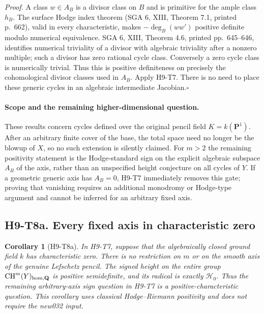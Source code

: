 \documentclass[11pt,a4paper]{article}
\newtheorem{corollary}[theorem]{Corollary}
\begin{document}
\emph{Proof.} A class $w\in A_B$ is a divisor class on $B$ and is
primitive for the ample class $h_B$. The surface Hodge index theorem
(SGA 6, XIII, Theorem 7.1, printed p.~662), valid in every
characteristic, makes $-\deg_B(ww')$ positive definite modulo numerical
equivalence. SGA 6, XIII, Theorem 4.6, printed pp.~645--646, identifies
numerical triviality of a divisor with algebraic triviality after a
nonzero multiple; such a divisor has zero rational cycle class.
Conversely a zero cycle class is numerically trivial. Thus this is
positive definiteness on precisely the cohomological divisor classes
used in $A_B$. Apply H9-T7. There is
no need to place these generic cycles in an algebraic intermediate
Jacobian.\hfill$\square$

\paragraph{Scope and the remaining higher-dimensional question.}
These results concern cycles defined over the original pencil field
$K=k(\mathbf P^1)$. After an arbitrary finite cover of the base, the
total space need no longer be the blowup of $X$, so no such extension is
silently claimed. For $m>2$ the remaining positivity statement is the
Hodge-standard sign on the explicit algebraic subspace $A_B$ of the
axis, rather than an unspecified height conjecture on all cycles of
$Y$. If a geometric generic axis has $A_B=0$, H9-T7 immediately removes
this gate; proving that vanishing requires an additional monodromy or
Hodge-type argument and cannot be inferred for an arbitrary fixed axis.


\subsection*{H9-T8a. Every fixed axis in characteristic zero}

\begin{corollary}[H9-T8a]\label{h9:T8a}
In H9-T7, suppose that the algebraically closed ground field $k$
has characteristic zero. There is no restriction on $m$ or on the
smooth axis of the genuine Lefschetz pencil. The signed height on
the entire group $\operatorname{CH}^m(Y)_{\rm hom,\mathbf Q}$ is
positive semidefinite, and its radical is exactly $\mathcal H_0$.
Thus the remaining arbitrary-axis sign question in H9-T7 is a
positive-characteristic question. This corollary uses classical
Hodge--Riemann positivity and does not require the new032 input.
\end{corollary}
\end{document}
